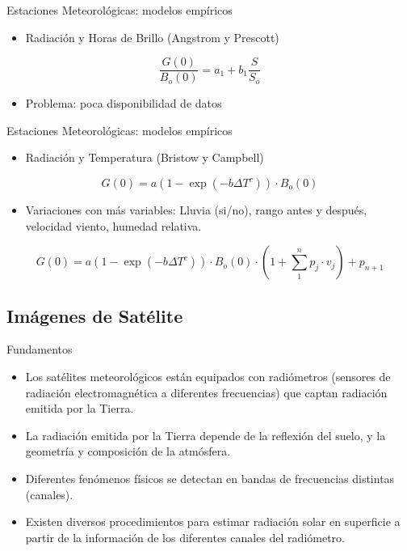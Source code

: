 \documentclass[xcolor={usenames,svgnames,dvipsnames}]{beamer}
\begin{document}
\begin{frame}[label={sec:org9a155d1}]{Estaciones Meteorológicas: modelos empíricos}
\begin{itemize}
\item Radiación y Horas de Brillo (Angstrom y Prescott)
\end{itemize}

\[
\frac{G(0)}{B_o(0)} = a_1 + b_1 \frac{S}{S_o}
\]

\begin{itemize}
\item Problema: poca disponibilidad de datos
\end{itemize}
\end{frame}

\begin{frame}[label={sec:org9f3738f}]{Estaciones Meteorológicas: modelos empíricos}
\begin{itemize}
\item Radiación y Temperatura (Bristow y Campbell)
\end{itemize}
\[
G(0) = a \left(1 - \exp(-b \Delta T^c)\right) \cdot B_o(0)
\]

\begin{itemize}
\item Variaciones con más variables: Lluvia (si/no), rango antes y después, velocidad viento, humedad relativa.
\end{itemize}

\[
  G(0) = a \left(1 - \exp(-b \Delta T^c)\right) \cdot B_o(0) \cdot \left(1 +
    \sum_1^n p_j \cdot v_j \right) + p_{n+1}
\]

\nocite{Antonanzas-Torres.Sanz-Garcia.ea2013}
\end{frame}

\subsection{Imágenes de Satélite}
\label{sec:org372fc92}

\begin{frame}[label={sec:orgad05e2e}]{Fundamentos}
\begin{itemize}
\item Los satélites meteorológicos están equipados con \alert{radiómetros}
(sensores de radiación electromagnética a diferentes frecuencias)
que captan \alert{radiación emitida por la Tierra}.

\item La radiación emitida por la Tierra depende de la \alert{reflexión del
suelo}, y la \alert{geometría y composición de la atmósfera}.

\item Diferentes fenómenos físicos se detectan en \alert{bandas de frecuencias}
distintas (canales).

\item Existen diversos procedimientos para \alert{estimar radiación solar} en
superficie a partir de la información de los diferentes canales del
radiómetro.
\end{itemize}
\end{frame}
\end{document}
